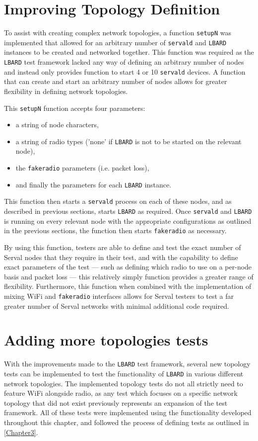 \section{Improving Topology Definition}
To assist with creating complex network topologies, a function \texttt{setupN} was implemented that allowed for an arbitrary number of \texttt{servald} and \texttt{LBARD} instances to be created and networked together.
This function was required as the \texttt{LBARD} test framework lacked any way of defining an arbitrary number of nodes and instead only provides function to start 4 or 10 \texttt{servald} devices.
A function that can create and start an arbitrary number of nodes allows for greater flexibility in defining network topologies.

This \texttt{setupN} function accepts four parameters:
\begin{itemize}
    \item a string of node characters, 
    \item a string of radio types ('none' if \texttt{LBARD} is not to be started on the relevant node), 
    \item the \texttt{fakeradio} parameters (i.e. packet loss), 
    \item and finally the parameters for each \texttt{LBARD} instance.
\end{itemize}

This function then starts a \texttt{servald} process on each of these nodes, and as described in previous sections, starts \texttt{LBARD} as required.
Once \texttt{servald} and \texttt{LBARD} is running on every relevant node with the appropriate configurations as outlined in the previous sections, the function then starts \texttt{fakeradio} as necessary.

By using this function, testers are able to define and test the exact number of Serval nodes that they require in their test, and with the capability to define exact parameters of the test — such as defining which radio to use on a per-node basis and packet loss — this relatively simply function provides a greater range of flexibility.
Furthermore, this function when combined with the implementation of mixing WiFi and \texttt{fakeradio} interfaces allows for Serval testers to test a far greater number of Serval networks with minimal additional code required.


\section{Adding more topologies tests}
With the improvements made to the \texttt{LBARD} test framework, several new topology tests can be implemented to test the functionality of \texttt{LBARD} in various different network topologies.
The implemented topology tests do not all strictly need to feature WiFi alongside radio, as any test which focuses on a specific network topology that did not exist previously represents an expansion of the test framework.
All of these tests were implemented using the functionality developed throughout this chapter, and followed the process of defining tests as outlined in \chaptername{ \ref{Chapter3}}.

